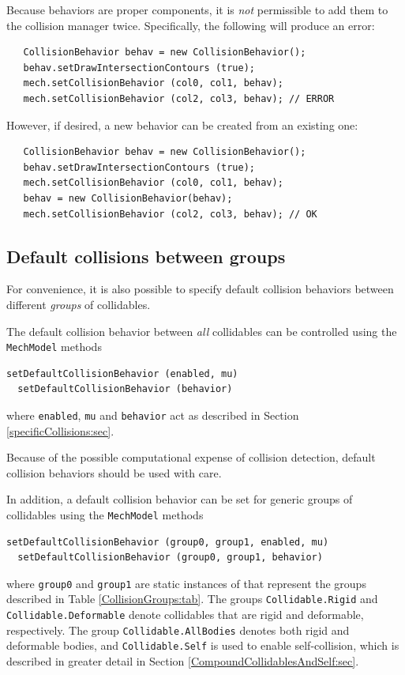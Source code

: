 \begin{sideblock}
Because behaviors are proper components, it is {\it not} permissible
to add them to the collision manager twice. Specifically, the
following will produce an error:
\begin{verbatim}
   CollisionBehavior behav = new CollisionBehavior();
   behav.setDrawIntersectionContours (true); 
   mech.setCollisionBehavior (col0, col1, behav);
   mech.setCollisionBehavior (col2, col3, behav); // ERROR
\end{verbatim}
However, if desired, a new behavior can be created from an existing
one:
\begin{verbatim}
   CollisionBehavior behav = new CollisionBehavior();
   behav.setDrawIntersectionContours (true); 
   mech.setCollisionBehavior (col0, col1, behav);
   behav = new CollisionBehavior(behav);
   mech.setCollisionBehavior (col2, col3, behav); // OK
\end{verbatim}
\end{sideblock}

\subsection{Default collisions between groups}

For convenience, it is also possible to specify default collision
behaviors between different {\it groups} of collidables.

The default collision behavior between {\it all} collidables can
be controlled using the {\tt MechModel} methods
%
\begin{lstlisting}[]
  setDefaultCollisionBehavior (enabled, mu)
  setDefaultCollisionBehavior (behavior)
\end{lstlisting}
%
where {\tt enabled}, {\tt mu} and {\tt behavior} act as described in
Section \ref{specificCollisions:sec}.

\begin{sideblock} 
Because of the possible computational expense of collision detection,
default collision behaviors should be used with care.
\end{sideblock} 

In addition, a default collision behavior can be set for generic
groups of collidables using the {\tt MechModel} methods
%
\begin{lstlisting}[]
  setDefaultCollisionBehavior (group0, group1, enabled, mu)
  setDefaultCollisionBehavior (group0, group1, behavior)
\end{lstlisting}
%
where {\tt group0} and {\tt group1} are static instances of
 that
represent the groups described in Table \ref{CollisionGroups:tab}.
The groups {\tt Collidable.Rigid} and {\tt Collidable.Deformable}
denote collidables that are rigid and deformable, respectively.  The
group {\tt Collidable.AllBodies} denotes both rigid and deformable
bodies, and {\tt Collidable.Self} is used to enable self-collision,
which is described in greater detail in Section
\ref{CompoundCollidablesAndSelf:sec}.

